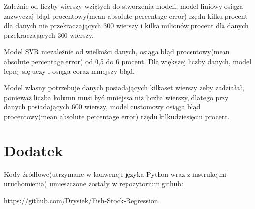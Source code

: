 \documentclass[10pt]{article}
\begin{document}
Zależnie od liczby wierszy wziętych do stworzenia modeli, model liniowy osiąga zazwyczaj błąd procentowy(mean absolute percentage error) rzędu kilku procent dla danych nie przekraczających 300 wierszy i kilka milionów procent dla danych przekraczających 300 wierszy. 

Model SVR niezależnie od wielkości danych, osiąga błąd procentowy(mean absolute percentage error) od 0,5 do 6 procent. Dla większej liczby danych, model lepiej się uczy i osiąga coraz mniejszy błąd.

Model własny potrzebuje danych posiadających kilkaset wierszy żeby zadziałał, ponieważ liczba kolumn musi być mniejsza niż liczba wierszy, dlatego przy danych posiadających 600 wierszy, model customowy osiąga błąd procentowy(mean absolute percentage error) rzędu kilkudziesięciu procent.

\appendix
\section{Dodatek}
Kody źródłowe(utrzymane w konwencji języka Python wraz z instrukcjmi uruchomienia) umieszczone zostały w repozytorium github:

\noindent \url{https://github.com/Drysiek/Fish-Stock-Regression}.
\end{document}
